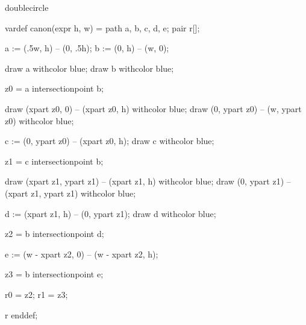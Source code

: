 
%

\startenvironment doublecircle

	\startMPdefinitions
		vardef canon(expr h, w) =
			path a, b, c, d, e;
			pair r[];

			a := (.5w, h) -- (0, .5h);
			b := (0, h) -- (w, 0);

			draw a withcolor blue;
			draw b withcolor blue;

			z0 = a intersectionpoint b; %

			draw (xpart z0, 0) -- (xpart z0, h) withcolor blue;
			draw (0, ypart z0) -- (w, ypart z0) withcolor blue;

			c := (0, ypart z0) -- (xpart z0, h);
			draw c withcolor blue;

			z1 = c intersectionpoint b;

			draw (xpart z1, ypart z1) -- (xpart z1, h) withcolor blue;
			draw (0, ypart z1) -- (xpart z1, ypart z1) withcolor blue;

			d := (xpart z1, h) -- (0, ypart z1);
			draw d withcolor blue;

			z2 = b intersectionpoint d; %

			e := (w - xpart z2, 0) -- (w - xpart z2, h); %

			z3 = b intersectionpoint e; %

			r0 = z2; %
			r1 = z3; %

			r
		enddef;
	\stopMPdefinitions

\stopenvironment

